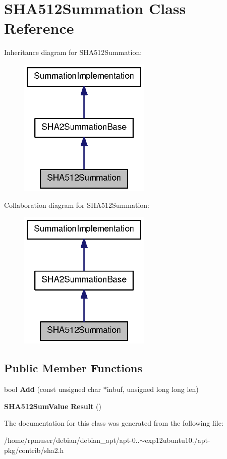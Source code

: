 \section{\-S\-H\-A512\-Summation \-Class \-Reference}
\label{classSHA512Summation}


\-Inheritance diagram for \-S\-H\-A512\-Summation\-:
\nopagebreak
\begin{figure}[H]
\begin{center}
\leavevmode
\includegraphics[width=178pt]{classSHA512Summation__inherit__graph}
\end{center}
\end{figure}


\-Collaboration diagram for \-S\-H\-A512\-Summation\-:
\nopagebreak
\begin{figure}[H]
\begin{center}
\leavevmode
\includegraphics[width=178pt]{classSHA512Summation__coll__graph}
\end{center}
\end{figure}
\subsection*{\-Public \-Member \-Functions}
\begin{DoxyCompactItemize}
\item 
bool {\bfseries \-Add} (const unsigned char $\ast$inbuf, unsigned long long len)\label{classSHA512Summation_aaf9245e21054d9eba3299d4cfd61e0e4}

\item 
{\bf \-S\-H\-A512\-Sum\-Value} {\bfseries \-Result} ()\label{classSHA512Summation_a6ecbbad19ebbd2e479d44d4906165df4}

\end{DoxyCompactItemize}


\-The documentation for this class was generated from the following file\-:\begin{DoxyCompactItemize}
\item 
/home/rpmuser/debian/debian\-\_\-apt/apt-\/0..$\sim$exp12ubuntu10./apt-\/pkg/contrib/sha2.\-h\end{DoxyCompactItemize}
